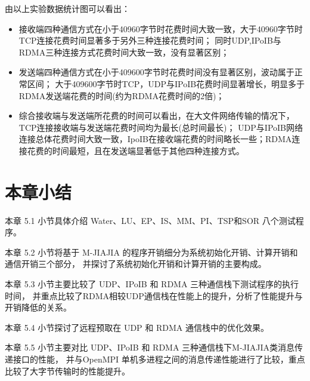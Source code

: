 {    由以上实验数据统计图可以看出：
    \begin{itemize}
        \item 接收端四种通信方式在小于40960字节时花费时间大致一致，大于40960字节时TCP连接花费时间显著多于另外三种连接花费时间；
              同时UDP,IPoIB与RDMA三种连接方式花费时间大致一致，没有显著区别；
        \item 发送端四种通信方式在小于409600字节时花费时间没有显著区别，波动属于正常区间；
              大于409600字节时TCP，UDP与IPoIB花费时间显著增长，明显多于RDMA发送端花费的时间(约为RDMA花费时间的2倍)；
        \item 综合接收端与发送端所花费的时间可以看出，在大文件网络传输的情况下，TCP连接接收端与发送端花费时间均为最长(总时间最长)；
              UDP与IPoIB网络连接总体花费时间大致一致，IpoIB在接收端花费的时间略长一些；RDMA连接花费的时间最短，且在发送端显著低于其他四种连接方式。
    \end{itemize}

    \section{本章小结}
    本章 5.1 小节具体介绍 Water、LU、EP、IS、MM、PI、TSP和SOR 八个测试程序。

    本章 5.2 小节将基于 M-JIAJIA 的程序开销细分为系统初始化开销、计算开销和通信开销三个部分，
    并探讨了系统初始化开销和计算开销的主要构成。

    本章 5.3 小节主要比较了 UDP、IPoIB 和 RDMA 三种通信栈下测试程序的执行时间，
    并重点比较了RDMA相较UDP通信栈在性能上的提升，分析了性能提升与开销降低的关系。

    本章 5.4 小节探讨了远程预取在 UDP 和 RDMA 通信栈中的优化效果。

    本章 5.5 小节主要对比 UDP、IPoIB 和 RDMA 三种通信栈下M-JIAJIA类消息传递接口的性能，
    并与OpenMPI 单机多进程之间的消息传递性能进行了比较，重点比较了大字节传输时的性能提升。
}
